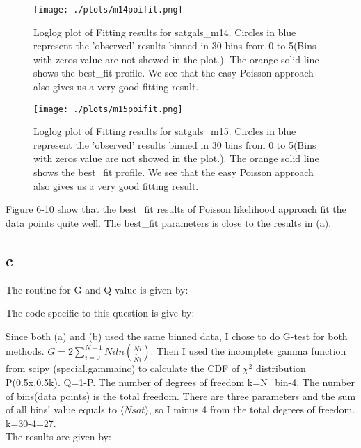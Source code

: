 

\begin{figure}[h!]
  \centering
  \texttt{[image: ./plots/m14poifit.png]}
  \caption{Loglog plot of Fitting results for satgals\_m14. Circles in blue represent the 'observed' results binned in 30 bins from 0 to 5(Bins with zeros value are not showed in the plot.). The orange solid line shows the best\_fit profile. We see that the easy Poisson approach also gives us a very good fitting result.}
  \label{fig9}
\end{figure}



\begin{figure}[h!]
  \centering
  \texttt{[image: ./plots/m15poifit.png]}
  \caption{Loglog plot of Fitting results for satgals\_m15. Circles in blue represent the 'observed' results binned in 30 bins from 0 to 5(Bins with zeros value are not showed in the plot.). The orange solid line shows the best\_fit profile. We see that the easy Poisson approach also gives us a very good fitting result.}
  \label{fig10}
\end{figure}

Figure 6-10 show that the best\_fit results of Poisson likelihood approach fit the data points quite well. The best\_fit parameters is close to the results in (a).\\

\clearpage

\subsection{c}
The routine for G and Q value is given by:


The code specific to this question is give by:


Since both (a) and (b) used the same binned data, I chose to do G-test for both methods. $G=2\sum_{i=0}^{N-1}Niln(\frac{Ni}{\tilde{Ni}})$. Then I used the incomplete gamma function from scipy (special.gammainc) to calculate the CDF of $\chi^2$ distribution P(0.5x,0.5k). Q=1-P.
The number of degrees of freedom k=N\_bin-4. The number of bins(data points) is the total freedom. There are three parameters and the sum of all bins' value equals to $\langle Nsat \rangle$, so I minus 4 from the total degrees of freedom. k=30-4=27.\\
The results are given by:






